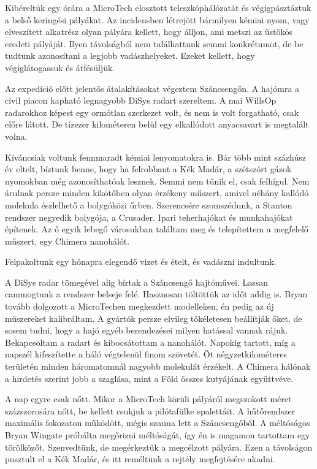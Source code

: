 \documentclass[10pt]{memoir}
\begin{document}
Kibéreltük egy órára a MicroTech elosztott teleszkóphálózatát és
végigpásztáztuk a belső keringési pályákat. Az incidensben létrejött bármilyen
kémiai nyom, vagy elveszített alkatrész olyan pályára kellett, hogy álljon, ami
metszi az üstökös eredeti pályáját. Ilyen távolságból nem találhattunk semmi
konkrétumot, de be tudtunk azonosítani a legjobb vadászhelyeket. Ezeket
kellett, hogy végiglátogassuk és átfésüljük.

Az expedíció előtt jelentős átalakításokat végeztem Száncsengőn. A hajómra a
civil piacon kapható legnagyobb DiSys radart szereltem. A mai WillsOp
radarokhoz képest egy ormótlan szerkezet volt, és nem is volt forgatható, csak
előre látott. De tízezer kilométeren belül egy elkallódott anyacsavart is
megtalált volna.

Kíváncsiak voltunk fennmaradt kémiai lenyomatokra is. Bár több mint százhúsz év
eltelt, bíztunk benne, hogy ha felrobbant a Kék Madár, a szétszórt gázok
nyomokban még azonosíthatóak lesznek. Semmi nem tűnik el, csak felhígul. Nem
árulnak persze minden kikötőben olyan érzékeny műszert, amivel néhány kallódó
molekula észlelhető a bolygóközi űrben. Szerencsére szomszédunk, a Stanton
rendszer negyedik bolygója, a Crusader. Ipari teherhajókat és munkahajókat
építenek. Az ő egyik lebegő városukban találtam meg és telepítettem a megfelelő
műszert, egy Chimera nanohálót.

Felpakoltunk egy hónapra elegendő vizet és ételt, és vadászni indultunk.

A DiSys radar tömegével alig bírtak a Száncsengő hajtóművei. Lassan cammogtunk
a rendszer belseje felé. Hasznosan töltöttük az időt addig is. Bryan tovább
dolgozott a MicroTechen megkezdett modelleken, én pedig az új műszereket
kalibráltam. A gyártók persze elvileg tökéletesen beállítják őket, de sosem
tudni, hogy a hajó egyéb berendezései milyen hatással vannak rájuk.
Bekapcsoltam a radart és kibocsátottam a nanohálót. Napokig tartott, míg a
napszél kifeszítette a háló végtelenül finom szövetét. Öt négyzetkilométeres
területén minden háromatomnál nagyobb molekulát érzékelt. A Chimera hálónak a
hirdetés szerint jobb a szaglása, mint a Föld összes kutyájának együttvéve.

A nap egyre csak nőtt. Mikor a MicroTech körüli pályáról megszokott méret
százszorosára nőtt, be kellett csukjuk a pilótafülke spalettáit. A hűtőrendszer
maximális fokozaton működött, mégis szauna lett a Száncsengőből. A méltóságos
Bryan Wingate próbálta megőrizni méltóságát, így én is magamon tartottam egy
törölközőt. Szenvedtünk, de megérkeztük a megcélzott pályára. Ezen a távolságon
pusztult el a Kék Madár, és itt reméltünk a rejtély megfejtésére akadni.
\end{document}
